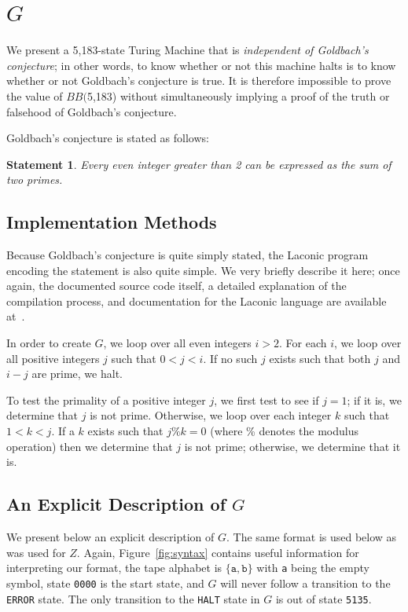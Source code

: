 \documentclass[11pt]{article}
\newtheorem{statement}{Statement}
\newcommand{\ghaltstate}{\texttt{5135}}
\newcommand{\gbstatenumstate}{5,183-state }
\newcommand{\bbgbstatenum}{$BB($5,183) }
\begin{document}


\section{$G$}

We present a \gbstatenumstate Turing Machine that is \emph{independent of Goldbach's conjecture}; in other words, to know whether or not this machine halts is to know whether or not Goldbach's conjecture is true. It is therefore impossible to prove the value of \bbgbstatenum without simultaneously implying a proof of the truth or falsehood of Goldbach's conjecture.

Goldbach's conjecture is stated as follows:

\begin{statement}
\emph{Every even integer greater than 2 can be expressed as the sum of two primes.}
\label{goldbachstatement}
\end{statement}

\subsection{Implementation Methods}

Because Goldbach's conjecture is quite simply stated, the Laconic program encoding the statement is also quite simple. We very briefly describe it here; once again, the documented source code itself, a detailed explanation of the compilation process, and documentation for the Laconic language are available at~\cite{github}.

In order to create $G$, we loop over all even integers $i > 2$. For each $i$, we loop over all positive integers $j$ such that $0 < j < i$. If no such $j$ exists such that both $j$ and $i - j$ are prime, we halt.

To test the primality of a positive integer $j$, we first test to see if $j = 1$; if it is, we determine that $j$ is not prime. Otherwise, we loop over each integer $k$ such that $1 < k < j$. If a $k$ exists such that $j \% k = 0$ (where \% denotes the modulus operation) then we determine that $j$ is not prime; otherwise, we determine that it is.

\subsection{An Explicit Description of $G$}

We present below an explicit description of $G$. The same format is used below as was used for $Z$. Again, Figure~\ref{fig:syntax} contains useful information for interpreting our format, the tape alphabet is $\{\texttt{a}, \texttt{b}\}$ with \texttt{a} being the empty symbol, state \texttt{0000} is the start state, and $G$ will never follow a transition to the \texttt{ERROR} state. The only transition to the \texttt{HALT} state in $G$ is out of state \ghaltstate. \\
\end{document}
